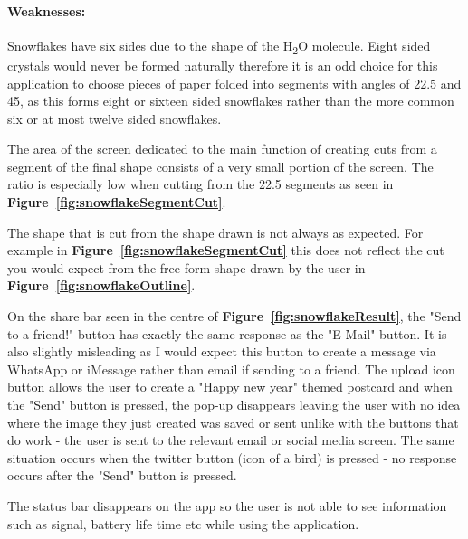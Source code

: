 \documentclass[11pt]{article}
\begin{document}
                \paragraph{Weaknesses:}
                Snowflakes have six sides due to the shape of the H\textsubscript{2}O molecule. Eight sided crystals would never be formed naturally therefore it is an odd choice for this application to choose pieces of paper folded into segments with angles of 22.5\textdegree{} and 45\textdegree{}, as this forms eight or sixteen sided snowflakes rather than the more common six or at most twelve sided snowflakes. %
                
                The area of the screen dedicated to the main function of creating cuts from a segment of the final shape consists of a very small portion of the screen. The ratio is especially low when cutting from the 22.5\textdegree{} segments as seen in \textbf{Figure~\ref{fig:snowflakeSegmentCut}}.
                
                The shape that is cut from the shape drawn is not always as expected. For example in \textbf{Figure~\ref{fig:snowflakeSegmentCut}} this does not reflect the cut you would expect from the free-form shape drawn by the user in \textbf{Figure~\ref{fig:snowflakeOutline}}.
               
                On the share bar seen in the centre of \textbf{Figure~\ref{fig:snowflakeResult}}, the "Send to a friend!" button has exactly the same response as the "E-Mail" button. It is also slightly  misleading as I would expect this button to create a message via WhatsApp or iMessage rather than email if sending to a friend. The upload icon button allows the user to create a "Happy new year" themed postcard and when the "Send" button is pressed, the pop-up disappears leaving the user with no idea where the image they just created was saved or sent unlike with the buttons that do work - the user is sent to the relevant email or social media screen. The same situation occurs when the twitter button (icon of a bird) is pressed - no response occurs after the "Send" button is pressed.
                
                The status bar disappears on the app so the user is not able to see information such as signal, battery life time etc while using the application. 
                 
\end{document}
